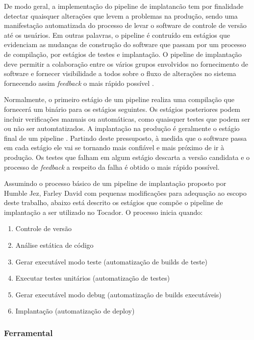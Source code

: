 De modo geral, a implementação do pipeline de implatancão tem por finalidade detectar quaisquer alterações que levem a problemas na produção, sendo uma manifestação automatizada do processo de levar o software de controle de versão até os usuários. Em outras palavras, o pipeline é contruído em estágios que evidenciam as mudanças de construção do software que passam por um processo de compilação, por estágios de testes e implantação. O pipeline de implantação deve permitir a colaboração entre os vários grupos envolvidos no fornecimento de software e fornecer visibilidade a todos sobre o fluxo de alterações no sistema fornecendo assim \textit{feedback} o mais rápido possível \cite{humble2010continuous}.

Normalmente, o primeiro estágio de um pipeline realiza uma compilação que fornecerá um binário para os estágios seguintes. Os estágios posteriores podem incluir verificações manuais ou automáticas, como quaisquer testes que podem ser ou não ser automtatizados. A implantação na produção é geralmente o estágio final de um pipeline \cite{humble2010continuous}. Partindo deste pressuposto, à medida que o software passa em cada estágio ele vai se tornando mais confiável e mais próximo de ir à produção. Os testes que falham em algum estágio descarta a versão candidata e o processo de \textit{feedback} a respeito da falha é obtido o mais rápido possível.

Assumindo o processo básico de um pipeline de implantação proposto por Humble Jez, Farley David \cite{humble2010continuous} com pequenas modificações para adequação ao escopo deste trabalho, abaixo está descrito os estágios que compõe o pipeline de implantação a ser utilizado no Tocador. O processo inicia quando:

\begin{enumerate}
	\item Controle de versão
	\item Análise estática de código
	\item Gerar executável modo teste (automatização de builds de teste)
	\item Executar testes unitários (automatização de testes)
	\item Gerar executável modo debug (automatização de builds executáveis)
	\item Implantação (automatização de deploy)
\end{enumerate}


\subsubsection{Ferramental}

